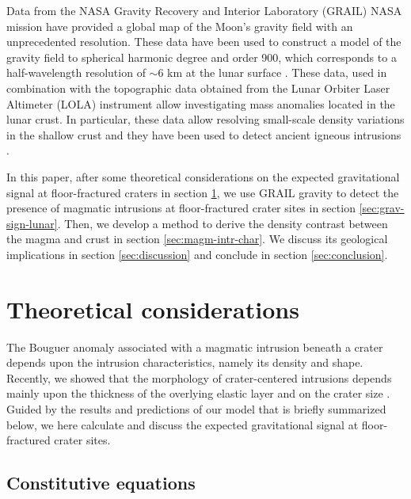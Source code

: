 Data from  the NASA Gravity  Recovery and Interior  Laboratory (GRAIL)
NASA mission  have provided a global  map of the Moon's  gravity field
with  an  unprecedented resolution.   These  data  have been  used  to
construct a  model of the  gravity field to spherical  harmonic degree
and order  900, which corresponds  to a half-wavelength  resolution of
$\sim 6$ km at the lunar surface \citep{Zuber:2013cp,Konopliv:2014gm}.
These data,  used in  combination with  the topographic  data obtained
from  the Lunar  Orbiter Laser  Altimeter (LOLA)  instrument allow  investigating mass anomalies located in the lunar crust.  In particular,
these  data allow  resolving  small-scale density  variations in  the
shallow crust \citep{Besserer:2014jr,Wieczorek:2013ipa}  and they have
been     used     to     detect     ancient     igneous     intrusions
\citep{AndrewsHanna:2013ft}.

In this paper,  after some theoretical considerations  on the expected
gravitational   signal   at   floor-fractured   craters   in   section
\ref{sec:theor-cons}, we use  GRAIL gravity to detect  the presence of
magmatic  intrusions  at  floor-fractured   crater  sites  in  section
\ref{sec:grav-sign-lunar}.  Then,  we develop  a method to  derive the
density   contrast   between   the   magma  and   crust   in   section
\ref{sec:magm-intr-char}.  We  discuss its geological  implications in
section     \ref{sec:discussion}    and     conclude    in     section
\ref{sec:conclusion}.

\section{Theoretical considerations}
\label{sec:theor-cons}

The Bouguer  anomaly associated  with a  magmatic intrusion  beneath a
crater depends upon the  intrusion characteristics, namely its density
and shape.  Recently, we showed that the morphology of crater-centered
intrusions depends mainly upon the  thickness of the overlying elastic
layer and  on the  crater size  \citep{Thorey:2014cv}.  Guided  by the
results and predictions of our model that is briefly summarized below,
we here  calculate and  discuss the  expected gravitational  signal at
floor-fractured crater sites.

\subsection{Constitutive equations}
\label{sec:const-equat-1}


